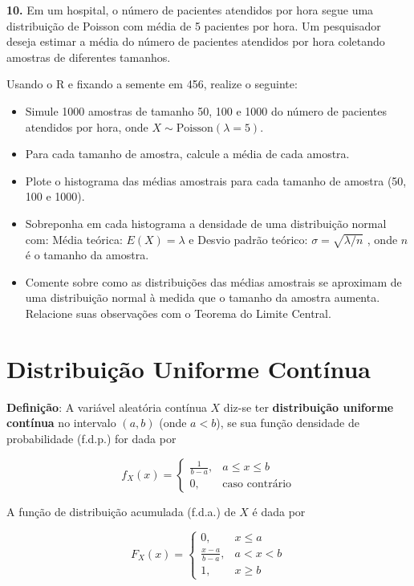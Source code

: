 \documentclass[
]{book}
\providecommand{\tightlist}{%
  \setlength{\itemsep}{0pt}\setlength{\parskip}{0pt}}
\begin{document}
\textbf{10.} Em um hospital, o número de pacientes atendidos por hora segue uma distribuição de Poisson com média de 5 pacientes por hora. Um pesquisador deseja estimar a média do número de pacientes atendidos por hora coletando amostras de diferentes tamanhos.

Usando o R e fixando a semente em 456, realize o seguinte:

\begin{itemize}
\tightlist
\item
  Simule 1000 amostras de tamanho 50, 100 e 1000 do número de pacientes atendidos por hora, onde \(X \sim \text{Poisson}(\lambda = 5)\).
\item
  Para cada tamanho de amostra, calcule a média de cada amostra.
\item
  Plote o histograma das médias amostrais para cada tamanho de amostra (50, 100 e 1000).
\item
  Sobreponha em cada histograma a densidade de uma distribuição normal com: Média teórica: \(E(X) = \lambda\) e Desvio padrão teórico: \(\sigma = \sqrt{\lambda / n}\) , onde \(n\) é o tamanho da amostra.
\item
  Comente sobre como as distribuições das médias amostrais se aproximam de uma distribuição normal à medida que o tamanho da amostra aumenta. Relacione suas observações com o Teorema do Limite Central.
\end{itemize}

\section{Distribuição Uniforme Contínua}\label{distribuiuxe7uxe3o-uniforme-contuxednua}

\textbf{Definição}: A variável aleatória contínua \(X\) diz-se ter \textbf{distribuição uniforme contínua} no intervalo \((a, b)\) (onde \(a < b\)), se sua função densidade de probabilidade (f.d.p.) for dada por

\[
f_{X}(x) = \begin{cases} 
\frac{1}{b - a}, & a \leq x \leq b \\ 
0, & \text{caso contrário} 
\end{cases}
\]

A função de distribuição acumulada (f.d.a.) de \(X\) é dada por

\[
F_{X}(x) = \begin{cases} 
0, & x \leq a \\ 
\frac{x - a}{b - a}, & a < x < b \\ 
1, & x \geq b 
\end{cases}
\]
\end{document}
